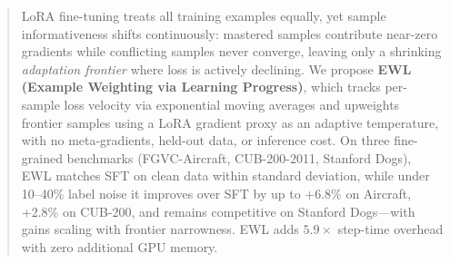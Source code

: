 \begin{abstract}
LoRA fine-tuning treats all training examples equally, yet sample informativeness
shifts continuously: mastered samples contribute near-zero gradients while
conflicting samples never converge, leaving only a shrinking \emph{adaptation
frontier} where loss is actively declining.
We propose \textbf{EWL (Example Weighting via Learning Progress)}, which tracks
per-sample loss velocity via exponential moving averages and upweights frontier
samples using a LoRA gradient proxy as an adaptive temperature, with no meta-gradients, held-out
data, or inference cost. On three fine-grained benchmarks (FGVC-Aircraft, CUB-200-2011, Stanford
Dogs), EWL matches SFT on clean data within standard deviation, while under
10--40\% label noise it improves over SFT by up to +6.8\% on Aircraft,
+2.8\% on CUB-200, and remains competitive on Stanford Dogs---with gains
scaling with frontier narrowness. EWL adds $5.9\times$ step-time overhead with zero additional GPU memory.
\end{abstract}

